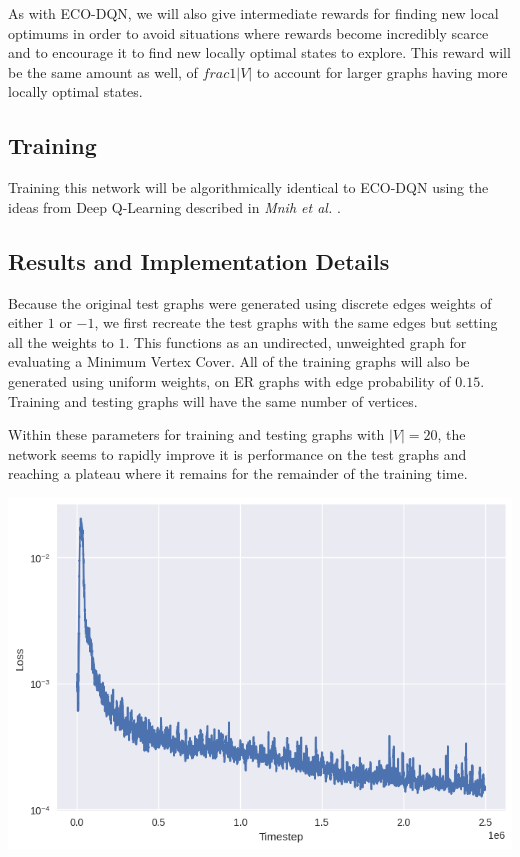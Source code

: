 \documentclass{article}
\begin{document}
As with ECO-DQN, we will also give intermediate rewards for finding new local optimums in order to avoid situations where rewards become incredibly scarce and to encourage it to find new locally optimal states to explore. This reward will be the same amount as well, of $frac{1}{|V|}$ to account for larger graphs having more locally optimal states.

\subsection{Training}

Training this network will be algorithmically identical to ECO-DQN \cite{eco-dqn} using the ideas from Deep Q-Learning described in \textit{Mnih et al.} \cite{deepmind_2015}.

\subsection{Results and Implementation Details}

Because the original test graphs were generated using discrete edges weights of either $1$ or $-1$, we first recreate the test graphs with the same edges but setting all the weights to $1$. This functions as an undirected, unweighted graph for evaluating a Minimum Vertex Cover. All of the training graphs will also be generated using uniform weights, on ER graphs with edge probability of $0.15$. Training and testing graphs will have the same number of vertices.

Within these parameters for training and testing graphs with $|V| = 20$, the network seems to rapidly improve it is performance on the test graphs and reaching a plateau where it remains for the remainder of the training time.

\includegraphics[scale=0.5]{../ER_20spin/eco/min_cover/network/loss.png}
\end{document}
